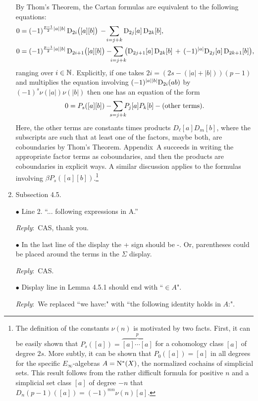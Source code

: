 \documentclass{amsart}
\newcommand{\ar}{\medskip\noindent\textit{Reply}:\ }
\def\subitem{\medskip\noindent$\bullet$ }
\begin{document}
\begin{enumerate}
	By Thom's Theorem, the Cartan formulas are equivalent to the following equations:
	\begin{equation}\label{eq:cartan_lift}
		\begin{split}
			0 &= (-1)^{\frac{p-1}{2}\bars{a}\bars{b}} \, \rD_{2i}\big([a][b]\big) \,-\!
			\sum_{i=j+k} \rD_{2j}[a] \, \rD_{2k}[b], \\
			0 &= (-1)^{\frac{p-1}{2}\bars{a}\bars{b}} \, \rD_{2i+1}\big([a][b]\big)
			-\sum_{\mathclap{i=j+k}} \big(\rD_{2j+1}[a] \, \rD_{2k}[b] \, +\, (-1)^{\bars{a}}\rD_{2j}[a] \, \rD_{2k+1}[b]\big),
		\end{split}
	\end{equation}
	ranging over $i \in \mathbb{N}$.
	Explicitly, if one takes $2i = (2s-(|a|+|b|))(p-1)$ and multiplies the equation involving $(-1)^{\lvert a\rvert\lvert b\rvert} \mathrm{D}_{2i}(ab)$ by $(-1)^s \nu(|a|)\nu(|b|)$ then one has an equation of the form
	\[
	0 = P_s([a][b]) - \sum_{\mathclap{s=j+k}} P_j[a] P_k[b] - \text{(other terms)}.
	\]
	Here, the other terms are constants times products $D_\ell[a] D_m[b]$, where the subscripts are such that at least one of the factors, maybe both, are coboundaries by Thom’s Theorem.
	Appendix~A succeeds in writing the appropriate factor terms as coboundaries, and then the products are coboundaries in explicit ways.
	A similar discussion applies to the formulas involving $\beta P_s([a][b])$.\footnote{\label{fn:mu}
		The definition of the constants $\nu(n)$ is motivated by two facts.
		First, it can be easily shown that $P_s([a]) = \overbrace{[a]\dotsb[a]}^p$ for a cohomology class $[a]$ of degree $2s$.
		More subtly, it can be shown that $P_0([a]) = [a]$ in all degrees for the specific $E_\infty$-algebras $A = \operatorname{N^{\ast}}(X)$, the normalized cochains of simplicial sets.
		This result follows from the rather difficult formula for positive $n$ and a simplicial set class $[a]$ of degree $-n$ that $D_n(p-1)([a]) = (-1)^{mn} \nu(n)[a]$.
	}

	\item Subsection 4.5.

	\subitem Line 2. “... following expressions in A.”

	\ar CAS, thank you.

	\subitem In the last line of the display the + sign should be -. Or, parentheses could be placed around the terms in the $\Sigma$ display.

	\ar CAS.

	\subitem Display line in Lemma 4.5.1 should end with ``$\in A$".

	\ar We replaced ``we have:" with ``the following identity holds in $A$:".


\end{enumerate}
\end{document}
